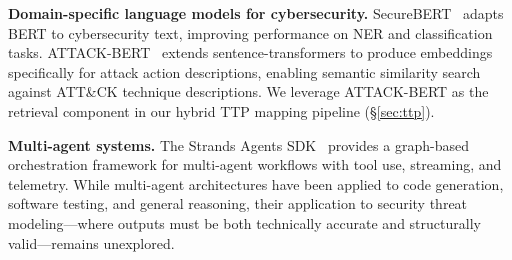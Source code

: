 \textbf{Domain-specific language models for cybersecurity.}
SecureBERT~\cite{aghaei2023securebert} adapts BERT to cybersecurity text, improving performance on NER and classification tasks. ATTACK-BERT~\cite{attackbert} extends sentence-transformers to produce embeddings specifically for attack action descriptions, enabling semantic similarity search against ATT\&CK technique descriptions. We leverage ATTACK-BERT as the retrieval component in our hybrid TTP mapping pipeline (\S\ref{sec:ttp}).

\textbf{Multi-agent systems.}
The Strands Agents SDK~\cite{strands2025} provides a graph-based orchestration framework for multi-agent workflows with tool use, streaming, and telemetry. While multi-agent architectures have been applied to code generation, software testing, and general reasoning, their application to security threat modeling---where outputs must be both technically accurate and structurally valid---remains unexplored.
